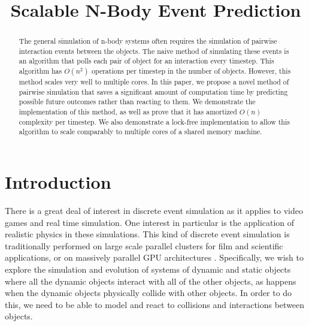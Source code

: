 \documentclass[conference]{IEEEtran}
\begin{document}
%
\title{Scalable N-Body Event Prediction}


\author{
\and{}
}

\maketitle


\begin{abstract} %
The general simulation of n-body systems often requires the simulation of pairwise interaction events between the objects.  The naive method of simulating these events is an algorithm that polls each pair of object for an interaction every timestep.  This algorithm has $O(n^2)$ operations per timestep in the number of objects.  However, this method scales very well to multiple cores. In this paper, we propose a novel method of pairwise simulation that saves a significant amount of computation time by predicting possible future outcomes rather than reacting to them.  We demonstrate the implementation of this method, as well as prove that it has amortized $O(n)$ complexity per timestep.  We also demonstrate a lock-free implementation to allow this algorithm to scale comparably to multiple cores of a shared memory machine.
\end{abstract}

\IEEEpeerreviewmaketitle


\section{Introduction}

There is a great deal of interest in discrete event simulation as it applies to video games and real time simulation. One interest in particular is the application of realistic physics in these simulations.  This kind of discrete event simulation is traditionally performed on large scale parallel clusters for film and scientific applications, or on massively parallel GPU architectures \cite{grape,uberflow}.  Specifically, we wish to explore the simulation and evolution of systems of dynamic and static objects where all the dynamic objects interact with all of the other objects, as happens when the dynamic objects physically collide with other objects.  In order to do this, we need to be able to model and react to collisions and interactions between objects. 
\end{document}

